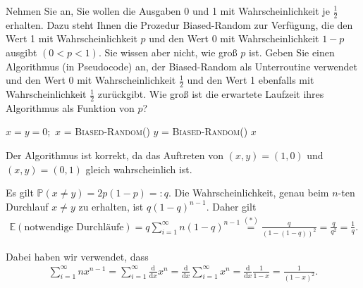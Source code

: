 
\begin{exercise}

\phantom{}Nehmen Sie an, Sie wollen die Ausgaben 0 und 1 mit Wahrscheinlichkeit je $\frac{1}{2}$ erhalten. Dazu steht Ihnen die Prozedur Biased-Random zur Verfügung, die den Wert 1 mit Wahrscheinlichkeit $p$ und den Wert 0 mit Wahrscheinlichkeit $1-p$ ausgibt $(0 < p < 1)$. Sie wissen aber nicht, wie groß $p$ ist. Geben Sie einen Algorithmus (in Pseudocode) an, der Biased-Random als Unterroutine verwendet und den Wert 0 mit Wahrscheinlichkeit $\frac{1}{2}$ und den Wert 1 ebenfalls mit Wahrscheinlichkeit $\frac{1}{2}$ zurückgibt. Wie groß ist die erwartete Laufzeit ihres Algorithmus als Funktion von $p$?

\end{exercise}



\begin{solution}

\begin{algorithm}
    \begin{algorithmic}[1]
        \State $x = y = 0;$
            \State $x$ = \textsc{Biased-Random()}
            \State $y$ = \textsc{Biased-Random()}
        \EndWhile
        \Return $x$
        \EndProcedure
    \end{algorithmic}
\end{algorithm}

Der Algorithmus ist \glqq korrekt\grqq{}, da das Auftreten von $(x, y) = (1, 0)$ und $(x, y) = (0, 1)$ gleich wahrscheinlich ist.

Es gilt $\mathbb P(x \neq y) = 2p(1-p) =\colon q$. Die Wahrscheinlichkeit, genau beim $n$-ten Durchlauf $x \neq y$ zu erhalten, ist $q (1-q)^{n-1}$. Daher gilt
\begin{align*}
    \mathbb E(\text{notwendige Durchläufe}) = q \sum_{i = 1}^\infty n (1-q)^{n-1} \stackrel{(\ast)}{=} \frac{q}{(1-(1-q))^2} = \frac{q}{q^2} = \frac{1}{q}.
\end{align*}

Dabei haben wir verwendet, dass
\begin{align}\tag{$\ast$}
    \sum_{i = 1}^\infty nx^{n-1} = \sum_{i = 1}^\infty \frac{\mathrm d}{\mathrm dx} x^n =
    \frac{\mathrm d}{\mathrm dx} \sum_{i = 1}^\infty x^n =
    \frac{\mathrm d}{\mathrm dx} \frac{1}{1-x} = \frac{1}{(1-x)^2}.
\end{align}

\end{solution}
